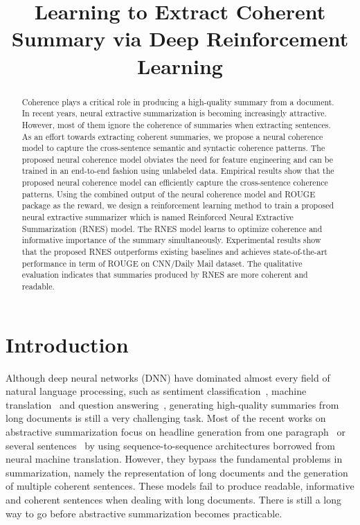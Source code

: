 \title{Learning to Extract Coherent Summary via Deep Reinforcement Learning}

\begin{abstract}
Coherence plays a critical role in producing a high-quality summary from a document. In recent years, neural extractive summarization is becoming increasingly attractive. However, most of them ignore the coherence of summaries when extracting sentences. As an effort towards extracting coherent summaries, we propose a neural coherence model to capture the cross-sentence semantic and syntactic coherence patterns. The proposed neural coherence model obviates the need for feature engineering and can be trained in an end-to-end fashion using unlabeled data. Empirical results show that the proposed neural coherence model can efficiently capture the cross-sentence coherence patterns. Using the combined output of the neural coherence model and ROUGE package as the reward, we design a reinforcement learning method to train a proposed neural extractive summarizer which is named Reinforced Neural Extractive Summarization (RNES) model. The RNES model learns to optimize coherence and informative importance of the summary simultaneously. Experimental results show that the proposed RNES outperforms existing baselines and achieves state-of-the-art performance in term of ROUGE on CNN/Daily Mail dataset. The qualitative evaluation indicates that summaries produced by RNES are more coherent and readable.
\end{abstract}

\section{Introduction}
	Although deep neural networks (DNN) have dominated almost every field of natural language processing, such as sentiment classification~\cite{duyutang-sentiment}, machine translation~\cite{cho-translation} and question answering~\cite{xiaoqiang}, generating high-quality summaries from long documents is still a very challenging task. Most of the recent works on abstractive summarization focus on headline generation from one paragraph~\cite{fb2015} or several sentences~\cite{lcsts} by using sequence-to-sequence architectures borrowed from neural machine translation. However, they bypass the fundamental problems in summarization, namely the representation of long documents and the generation of multiple coherent sentences. These models fail to produce readable, informative and coherent sentences when dealing with long documents. There is still a long way to go before abstractive summarization becomes practicable.

